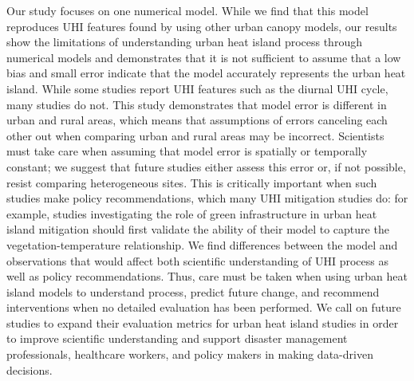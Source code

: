 \documentclass[draft,linenumbers]{agujournal}
\begin{document}
Our study focuses on one numerical model. While we find that this model reproduces UHI features found by using other urban canopy models, our results show the limitations of understanding urban heat island process through numerical models and demonstrates that it is not sufficient to assume that a low bias and small error indicate that the model accurately represents the urban heat island.  
While some studies report UHI features such as the diurnal UHI cycle, many studies do not. 
This study demonstrates that model error is different in urban and rural areas, which means that assumptions of errors canceling each other out when comparing urban and rural areas may be incorrect. Scientists must take care when assuming that model error is spatially or temporally constant; we suggest that future studies either assess this error or, if not possible, resist comparing heterogeneous sites. This is critically important when such studies make policy recommendations, which many UHI mitigation studies do: for example, studies investigating the role of green infrastructure in urban heat island mitigation should first validate the ability of their model to capture the vegetation-temperature relationship. 
We find differences between the model and observations that would affect both scientific understanding of UHI process as well as policy recommendations. 
Thus, care must be taken when using urban heat island models to understand process, predict future change, and recommend interventions when no detailed evaluation has been performed. We call on future studies to expand their evaluation metrics for urban heat island studies in order to improve scientific understanding and support disaster management professionals, healthcare workers, and policy makers in making data-driven decisions. 





%
%
%
%
 
\end{document}
